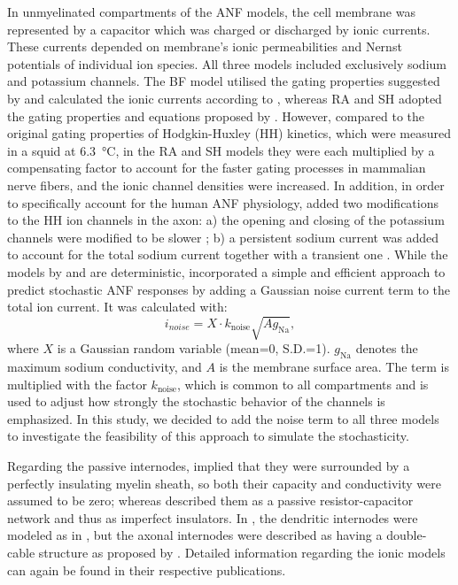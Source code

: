 \documentclass[utf8]{frontiersSCNS} %
\newcommand{\T}[1]{\text{#1}}
\begin{document}
In unmyelinated compartments of the ANF models, the cell membrane was represented by a capacitor which was charged or discharged by ionic currents. These currents depended on membrane's ionic permeabilities and Nernst potentials of individual ion species. All three models included exclusively sodium and potassium channels. 
The BF model utilised the gating properties suggested by \cite{Schwarz1987} and calculated the ionic currents according to \cite{Frankenhaeuser1964}, whereas RA and SH adopted the gating properties and equations proposed by \cite{Hodgkin1952}. 
However, compared to the original gating properties of Hodgkin-Huxley (HH) kinetics, which were measured in a squid at \SI{6.3}{\celsius}, in the RA and SH models they were each multiplied by a compensating factor to account for the faster gating processes in mammalian nerve fibers, and the ionic channel densities were increased.
In addition, in order to specifically account for the human ANF physiology, \cite{Smit2010} added two modifications to the HH ion channels in the axon: a) the opening and closing of the potassium channels were modified to be slower
 \citep{Smit2008}; b) a persistent sodium current was added to account for the total sodium current together with a transient one  \citep{Smit2009}. %
While the models by \cite{Briaire2005} and \cite{Smit2010} are deterministic, \cite{Rattay2001} incorporated a simple and efficient approach to predict stochastic ANF responses by adding a Gaussian noise current term to the total ion current. It was calculated with:
\begin{equation}
i_{noise} = X \cdot k_{\T{noise}} \sqrt{A g_{\T{Na}}},
\label{equ:stochasticity_rattay}
\end{equation}
where $X$ is a Gaussian random variable (mean=0, S.D.=1). $g_{\T{Na}}$ denotes the maximum sodium conductivity, and $A$ is the membrane surface area. The term is multiplied with the factor $k_{\T{noise}}$, which is common to all compartments and is used to adjust how strongly the stochastic behavior of the channels is emphasized. In this study, we decided to add the noise term to all three models to investigate the feasibility of this approach to simulate the stochasticity.

Regarding the passive internodes, \cite{Briaire2005} implied that they were surrounded by a perfectly insulating myelin sheath, so both their capacity and conductivity were assumed to be zero; whereas \cite{Rattay2001} described them as a passive resistor-capacitor network and thus as imperfect insulators. In \cite{Smit2010}, the dendritic internodes were modeled as in \cite{Rattay2001}, but the axonal internodes were described as having a double-cable structure as proposed by \cite{Blight1985}. Detailed information regarding the ionic models can again be found in their respective publications. 
\end{document}
